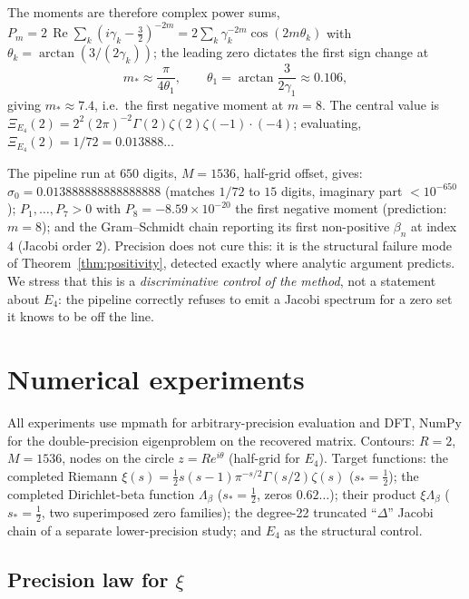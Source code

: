 \documentclass[11pt]{article}
\theoremstyle{definition}
\begin{document}
The moments are therefore complex power sums,
$P_m=2\,\operatorname{Re}\sum_k(i\gamma_k-\tfrac32)^{-2m}
=2\sum_k\gamma_k^{-2m}\cos(2m\theta_k)$ with
$\theta_k=\arctan(3/(2\gamma_k))$; the leading zero dictates the
first sign change at
\begin{equation}\label{eq:e4predict}
m_\ast\approx\frac{\pi}{4\theta_1},\qquad
\theta_1=\arctan\frac{3}{2\gamma_1}\approx0.106,
\end{equation}
giving $m_\ast\approx 7.4$, i.e.\ the first negative moment at
$m=8$. The central value is $\Xi_{E_4}(2)=2^2(2\pi)^{-2}\Gamma(2)
\zeta(2)\zeta(-1)\cdot(-4)$; evaluating,
$\Xi_{E_4}(2)=1/72=0.013888\ldots$

The pipeline run at $650$ digits, $M=1536$, half-grid offset, gives:
$\sigma_0=0.013888888888888888$ (matches $1/72$ to $15$ digits,
imaginary part $<10^{-650}$); $P_1,\dots,P_7>0$ with
$P_8=-8.59\times10^{-20}$ the first negative moment
(prediction: $m=8$); and the Gram--Schmidt chain reporting its first
non-positive $\beta_n$ at index $4$ (Jacobi order $2$). Precision
does not cure this: it is the structural failure mode of
Theorem~\ref{thm:positivity}, detected exactly where analytic
argument predicts. We stress that this is a \emph{discriminative
control of the method}, not a statement about $E_4$: the pipeline
correctly refuses to emit a Jacobi spectrum for a zero set it knows
to be off the line.

\section{Numerical experiments}\label{sec:experiments}

All experiments use mpmath \cite{mpmath} for arbitrary-precision
evaluation and DFT, NumPy for the double-precision eigenproblem on
the recovered matrix. Contours: $R=2$, $M=1536$, nodes on the circle
$z=Re^{i\theta}$ (half-grid for $E_4$). Target functions: the
completed Riemann $\xi(s)=\tfrac12 s(s-1)\pi^{-s/2}\Gamma(s/2)\zeta(s)$
($s_\ast=\tfrac12$); the completed Dirichlet-beta function
$\Lambda_\beta$ ($s_\ast=\tfrac12$, zeros $0.62\ldots$); their
product $\xi\Lambda_\beta$ ($s_\ast=\tfrac12$, two superimposed zero
families); the degree-22 truncated ``$\Delta$'' Jacobi chain of a
separate lower-precision study; and $E_4$ as the structural control.

\subsection{Precision law for $\xi$}\label{sec:preclaw}
\end{document}
